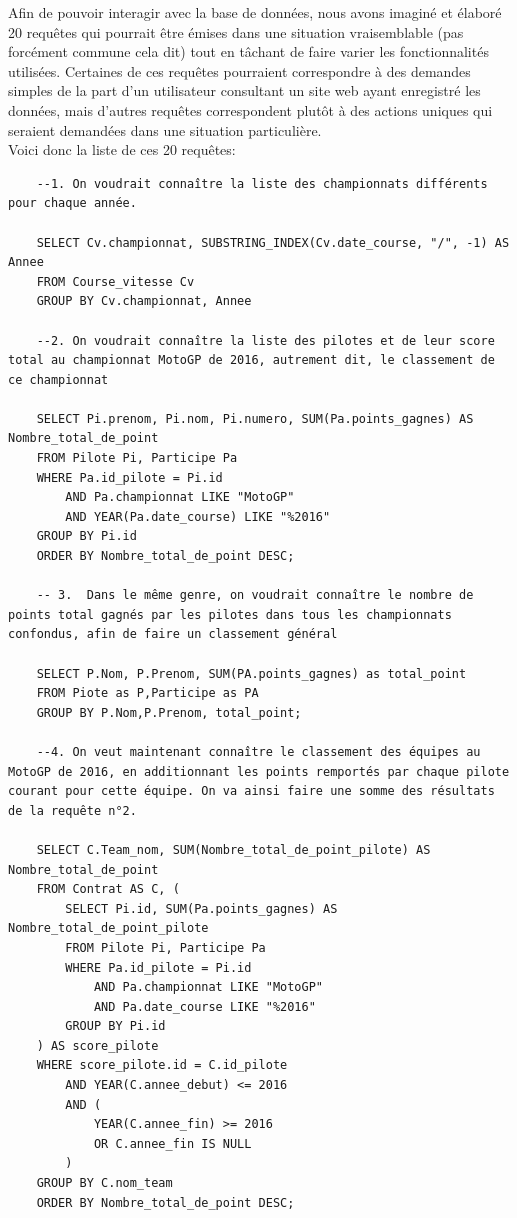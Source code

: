 \documentclass[12pt,a4paper]{article}
\newenvironment{code}{\captionsetup{type=listing}}{}
\begin{document}
Afin de pouvoir interagir avec la base de données, nous avons imaginé et élaboré 20 requêtes qui pourrait être émises dans une situation vraisemblable (pas forcément commune cela dit) tout en tâchant de faire varier les fonctionnalités utilisées. Certaines de ces requêtes pourraient correspondre à des demandes simples de la part d'un utilisateur consultant un site web ayant enregistré les données, mais d'autres requêtes correspondent plutôt à des actions uniques qui seraient demandées dans une situation particulière.
\\Voici donc la liste de ces 20 requêtes:
\\
\begin{code}
    \begin{verbatim}
    --1. On voudrait connaître la liste des championnats différents pour chaque année.
    
    SELECT Cv.championnat, SUBSTRING_INDEX(Cv.date_course, "/", -1) AS Annee
    FROM Course_vitesse Cv
    GROUP BY Cv.championnat, Annee
    
    --2. On voudrait connaître la liste des pilotes et de leur score total au championnat MotoGP de 2016, autrement dit, le classement de ce championnat

    SELECT Pi.prenom, Pi.nom, Pi.numero, SUM(Pa.points_gagnes) AS Nombre_total_de_point
    FROM Pilote Pi, Participe Pa
    WHERE Pa.id_pilote = Pi.id
        AND Pa.championnat LIKE "MotoGP"
        AND YEAR(Pa.date_course) LIKE "%2016"
    GROUP BY Pi.id
    ORDER BY Nombre_total_de_point DESC;
    
    -- 3.  Dans le même genre, on voudrait connaître le nombre de points total gagnés par les pilotes dans tous les championnats confondus, afin de faire un classement général
    
    SELECT P.Nom, P.Prenom, SUM(PA.points_gagnes) as total_point
    FROM Piote as P,Participe as PA
    GROUP BY P.Nom,P.Prenom, total_point;
    
    --4. On veut maintenant connaître le classement des équipes au MotoGP de 2016, en additionnant les points remportés par chaque pilote courant pour cette équipe. On va ainsi faire une somme des résultats de la requête n°2.

    SELECT C.Team_nom, SUM(Nombre_total_de_point_pilote) AS Nombre_total_de_point
    FROM Contrat AS C, (
        SELECT Pi.id, SUM(Pa.points_gagnes) AS Nombre_total_de_point_pilote
        FROM Pilote Pi, Participe Pa
        WHERE Pa.id_pilote = Pi.id
            AND Pa.championnat LIKE "MotoGP"
            AND Pa.date_course LIKE "%2016"
        GROUP BY Pi.id
    ) AS score_pilote
    WHERE score_pilote.id = C.id_pilote
        AND YEAR(C.annee_debut) <= 2016
        AND (
            YEAR(C.annee_fin) >= 2016
            OR C.annee_fin IS NULL
        )
    GROUP BY C.nom_team
    ORDER BY Nombre_total_de_point DESC;
    

\end{verbatim}
\end{code}
\end{document}
